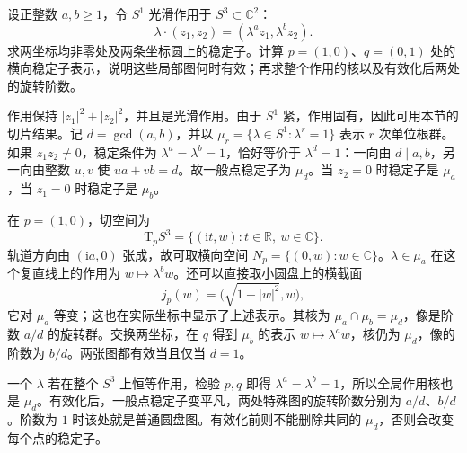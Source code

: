 \begin{exercise}\label{g1:ex:weighted-circle-local-quotients}
	设正整数 \(a,b\geq1\)，令 \(S^1\) 光滑作用于 \(S^3\subset\mathbb C^2\)：
	\[
		\lambda\cdot(z_1,z_2)=(\lambda^a z_1,\lambda^b z_2).
	\]
	求两坐标均非零处及两条坐标圆上的稳定子。计算 \(p=(1,0)\)、\(q=(0,1)\) 处的横向稳定子表示，说明这些局部图何时有效；再求整个作用的核以及有效化后两处的旋转阶数。
\end{exercise}
\begin{solution}
	作用保持 \(|z_1|^2+|z_2|^2\)，并且是光滑作用。由于 \(S^1\) 紧，作用固有，因此可用本节的切片结果。记 \(d=\gcd(a,b)\)，并以 \(\mu_r=\{\lambda\in S^1:\lambda^r=1\}\) 表示 \(r\) 次单位根群。如果 \(z_1z_2\ne0\)，稳定条件为 \(\lambda^a=\lambda^b=1\)，恰好等价于 \(\lambda^d=1\)：一向由 \(d\mid a,b\)，另一向由整数 \(u,v\) 使 \(ua+vb=d\)。故一般点稳定子为 \(\mu_d\)。当 \(z_2=0\) 时稳定子是 \(\mu_a\)，当 \(z_1=0\) 时稳定子是 \(\mu_b\)。

	在 \(p=(1,0)\)，切空间为
	\[
		\mathrm{T}_pS^3=\{(\mathrm{i}t,w):t\in\mathbb R,\ w\in\mathbb C\}.
	\]
	轨道方向由 \((\mathrm{i}a,0)\) 张成，故可取横向空间 \(N_p=\{(0,w):w\in\mathbb C\}\)。\(\lambda\in\mu_a\) 在这个复直线上的作用为 \(w\mapsto\lambda^b w\)。还可以直接取小圆盘上的横截面
	\[
		j_p(w)=\bigl(\sqrt{1-|w|^2},w\bigr),
	\]
	它对 \(\mu_a\) 等变；这也在实际坐标中显示了上述表示。其核为 \(\mu_a\cap\mu_b=\mu_d\)，像是阶数 \(a/d\) 的旋转群。交换两坐标，在 \(q\) 得到 \(\mu_b\) 的表示 \(w\mapsto\lambda^a w\)，核仍为 \(\mu_d\)，像的阶数为 \(b/d\)。两张图都有效当且仅当 \(d=1\)。

	一个 \(\lambda\) 若在整个 \(S^3\) 上恒等作用，检验 \(p,q\) 即得 \(\lambda^a=\lambda^b=1\)，所以全局作用核也是 \(\mu_d\)。有效化后，一般点稳定子变平凡，两处特殊图的旋转阶数分别为 \(a/d\)、\(b/d\)。阶数为 \(1\) 时该处就是普通圆盘图。有效化前则不能删除共同的 \(\mu_d\)，否则会改变每个点的稳定子。
\end{solution}


